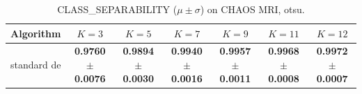 \begin{table}[htbp]
\centering
\caption{CLASS_SEPARABILITY ($\mu \pm \sigma$) on CHAOS MRI, otsu.}
\label{tab:exp2-otsu-class_separability}
\begin{tabular}{lcccccc}
\toprule
Algorithm & $K=3$ & $K=5$ & $K=7$ & $K=9$ & $K=11$ & $K=12$ \\
\midrule
standard de & \textbf{0.9760 $\pm$ 0.0076} & \textbf{0.9894 $\pm$ 0.0030} & \textbf{0.9940 $\pm$ 0.0016} & \textbf{0.9957 $\pm$ 0.0011} & \textbf{0.9968 $\pm$ 0.0008} & \textbf{0.9972 $\pm$ 0.0007} \\
\bottomrule
\end{tabular}
\end{table}